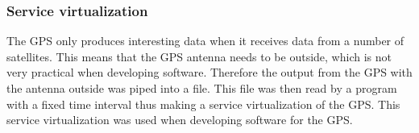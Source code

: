 
\subsubsection{Service virtualization}
The GPS only produces interesting data when it receives data from a number of satellites. 
This means that the GPS antenna needs to be outside, which is not very practical when developing software.
Therefore the output from the GPS with the antenna outside was piped into a file.
This file was then read by a program with a fixed time interval thus making a service virtualization of the GPS.
This service virtualization was used when developing software for the GPS.